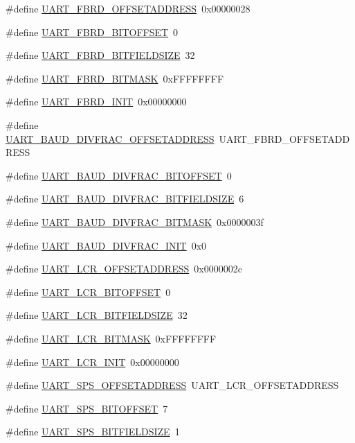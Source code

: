 \begin{DoxyCompactItemize}
\#define \hyperlink{a00575_a08bfcb8c515af301e8b15b83ea40900d}{UART\_\-FBRD\_\-OFFSETADDRESS}~0x00000028
\item 
\#define \hyperlink{a00575_ae804f1f1f6d9d81212af15f1c9f709e6}{UART\_\-FBRD\_\-BITOFFSET}~0
\item 
\#define \hyperlink{a00575_a44902619bd95edbe441b50b625816f6b}{UART\_\-FBRD\_\-BITFIELDSIZE}~32
\item 
\#define \hyperlink{a00575_a5f4f70e2fb44e713446b5a84aeed685a}{UART\_\-FBRD\_\-BITMASK}~0xFFFFFFFF
\item 
\#define \hyperlink{a00575_a69b539f2993654b603b9e50600c93fa1}{UART\_\-FBRD\_\-INIT}~0x00000000
\item 
\#define \hyperlink{a00575_a16c72eda23f1413ee2cc1d755fcdcb15}{UART\_\-BAUD\_\-DIVFRAC\_\-OFFSETADDRESS}~UART\_\-FBRD\_\-OFFSETADDRESS
\item 
\#define \hyperlink{a00575_aac32136d62b40c985b7298871fe91a05}{UART\_\-BAUD\_\-DIVFRAC\_\-BITOFFSET}~0
\item 
\#define \hyperlink{a00575_a9395f6e94adc5a7b0b25bf21fabf2a10}{UART\_\-BAUD\_\-DIVFRAC\_\-BITFIELDSIZE}~6
\item 
\#define \hyperlink{a00575_a0cce01253fdf8ce89e55e7724c7fa977}{UART\_\-BAUD\_\-DIVFRAC\_\-BITMASK}~0x0000003f
\item 
\#define \hyperlink{a00575_a8e4335c31ee118fd2a6f2dba0576195b}{UART\_\-BAUD\_\-DIVFRAC\_\-INIT}~0x0
\item 
\#define \hyperlink{a00575_a95ecbfebf796859e00c3f4b7f107fb5a}{UART\_\-LCR\_\-OFFSETADDRESS}~0x0000002c
\item 
\#define \hyperlink{a00575_a0d1d3e3a08b9268e877ad2081917ec42}{UART\_\-LCR\_\-BITOFFSET}~0
\item 
\#define \hyperlink{a00575_a295597cd8469e3746c4bdb389595f79d}{UART\_\-LCR\_\-BITFIELDSIZE}~32
\item 
\#define \hyperlink{a00575_a28e31fe85eeeb124ff6a471978155356}{UART\_\-LCR\_\-BITMASK}~0xFFFFFFFF
\item 
\#define \hyperlink{a00575_ab6fe7ce8caa8f59cb608e2c8316a3cf8}{UART\_\-LCR\_\-INIT}~0x00000000
\item 
\#define \hyperlink{a00575_a29dafda48460497ae59affbd6044d138}{UART\_\-SPS\_\-OFFSETADDRESS}~UART\_\-LCR\_\-OFFSETADDRESS
\item 
\#define \hyperlink{a00575_a8b7dedbd461b903a619d56b2ed3fbb4f}{UART\_\-SPS\_\-BITOFFSET}~7
\item 
\#define \hyperlink{a00575_a03d26824a97e5400b7d132d9671d3f63}{UART\_\-SPS\_\-BITFIELDSIZE}~1

\end{DoxyCompactItemize}
